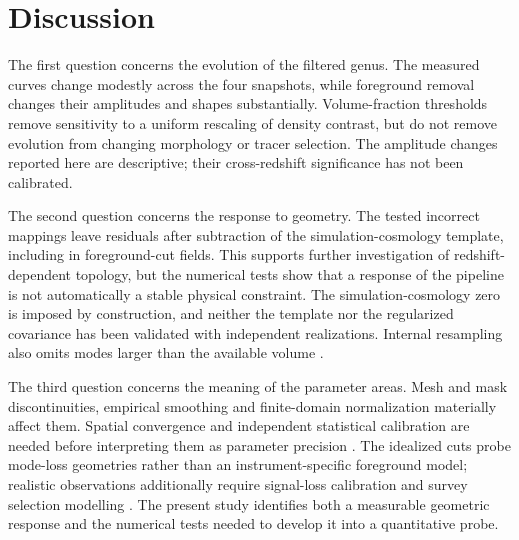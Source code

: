 \section{Discussion}\label{sec:discussion}
The first question concerns the evolution of the filtered genus. The measured curves change modestly across the four snapshots, while foreground removal changes their amplitudes and shapes substantially. Volume-fraction thresholds remove sensitivity to a uniform rescaling of density contrast, but do not remove evolution from changing morphology or tracer selection. The amplitude changes reported here are descriptive; their cross-redshift significance has not been calibrated.

The second question concerns the response to geometry. The tested incorrect mappings leave residuals after subtraction of the simulation-cosmology template, including in foreground-cut fields. This supports further investigation of redshift-dependent topology, but the numerical tests show that a response of the pipeline is not automatically a stable physical constraint. The simulation-cosmology zero is imposed by construction, and neither the template nor the regularized covariance has been validated with independent realizations. Internal resampling also omits modes larger than the available volume \citep{LacasaKunz2017InternalSSC}.

The third question concerns the meaning of the parameter areas. Mesh and mask discontinuities, empirical smoothing and finite-domain normalization materially affect them. Spatial convergence and independent statistical calibration are needed before interpreting them as parameter precision \citep{Kim2014GenusSystematics,Appleby2017,ApplebyBOSS2022}. The idealized cuts probe mode-loss geometries rather than an instrument-specific foreground model; realistic observations additionally require signal-loss calibration and survey selection modelling \citep{Cunnington2020ForegroundPNG,Cunnington2023ForegroundTransfer}. The present study identifies both a measurable geometric response and the numerical tests needed to develop it into a quantitative probe.
